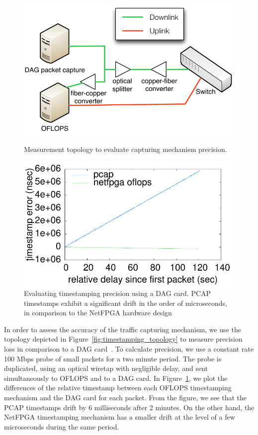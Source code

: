 \begin{figure}
\centering
  \begin{minipage}[b]{0.45\textwidth}
\centering
 \includegraphics[width=0.99\textwidth]{Chapter1/Chapter1Figs/accuracy-topology} 
 \caption{Measurement topology to evaluate capturing mechanism precision.}
\label{fig:timestamping_topology}
\end{minipage}
\hspace{0.5cm}
  \begin{minipage}[b]{0.45\textwidth}
\centering
 \includegraphics[width=0.99\textwidth]{Chapter1/Chapter1Figs/timer-precision} 
 \caption{Evaluating timestamping precision using a DAG card. PCAP timestamps
   exhibit a significant drift in the order of microseconds, in comparison to
   the NetFPGA hardware design}
\label{fig:timestamping}
\end{minipage}
\end{figure}

In order to assess the accuracy of the traffic capturing mechanism, we use the
topology depicted in Figure~\ref{fig:timestamping_topology} to measure precision
loss in comparison to a DAG card~\cite{dag_card}.  To calculate precision, we
use a constant rate 100 Mbps probe of small packets for a two minute period. The
probe is duplicated, using an optical wiretap with negligible delay, and sent
simultaneously to OFLOPS and to a DAG card. In Figure~\ref{fig:timestamping}, we
plot the differences of the relative timestamp between each OFLOPS timestamping
mechanism and the DAG card for each packet. From the figure, we see that the
PCAP timestamps drift by 6 milliseconds after 2 minutes.  On the other hand, the
NetFPGA timestamping mechanism has a smaller drift at the level of a few
microseconds during the same period.

